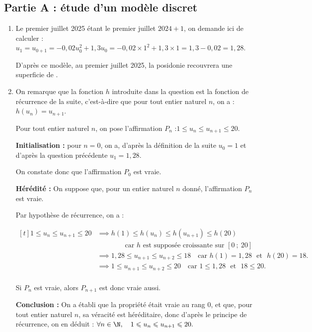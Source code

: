 \medskip
\subsection*{Partie A : étude d'un modèle discret}

\begin{enumerate}
	\item Le premier juillet 2025 étant le premier juillet $2024 + 1$, on demande ici de calculer :
	$u_1 = u_{0 + 1} = -0,02u_0^2 + 1,3u_0 = -0,02\times 1^2 + 1,3 \times 1 = 1,3-0,02 = 1,28$.

	D'après ce modèle, au premier juillet 2025, la posidonie recouvrera une superficie de .

	\item On remarque que la fonction $h$ introduite dans la question est la fonction de récurrence de la suite, c'est-à-dire que pour tout entier naturel $n$, on a : $h(u_n)= u_{n+1}$.

	Pour tout entier naturel $n$, on pose l'affirmation $P_n$ :\quad \og $1 \leqslant u_n \leqslant u_{n+1} \leqslant 20$.\fg{}

	\textbf{Initialisation : } pour $n = 0$, on a, d'après la définition de la suite $u_0 = 1$ et d'après la question précédente $u_1 = 1,28$.

	On constate donc que l'affirmation $P_0$ est vraie.

	\textbf{Hérédité :} On suppose que, pour un entier naturel $n$ donné, l'affirmation $P_n$ est vraie.

	Par hypothèse de récurrence, on a :

	$\begin{aligned}[t] 1 \leqslant u_n \leqslant u_{n+1} \leqslant 20
		&\implies h(1) \leqslant h(u_n) \leqslant h(u_{n+1}) \leqslant h(20)\\
		&\qquad \qquad \text{car $h$ est supposée croissante sur }[0~;~20]\\
		&\implies 1,28 \leqslant u_{n+1} \leqslant u_{n+2} \leqslant 18 \quad \text{car } h(1) = 1,28 \text{~ et ~} h(20) = 18.\\
		&\implies 1 \leqslant u_{n+1} \leqslant u_{n+2} \leqslant 20 \quad \text{car } 1 \leqslant 1,28 \text{~ et ~} 18 \leqslant 20.\\
	\end{aligned}$

	Si $P_n$ est vraie, alors $P_{n+1}$ est donc vraie aussi.

	\textbf{Conclusion : } On a établi que la propriété était vraie au rang 0, et que, pour tout entier naturel $n$, sa véracité est héréditaire, donc d'après le principe de récurrence, on en déduit :
	\quad
	$\forall n \in \N,\quad 1 \leqslant u_n \leqslant u_{n+1} \leqslant 20.$


\end{enumerate}
